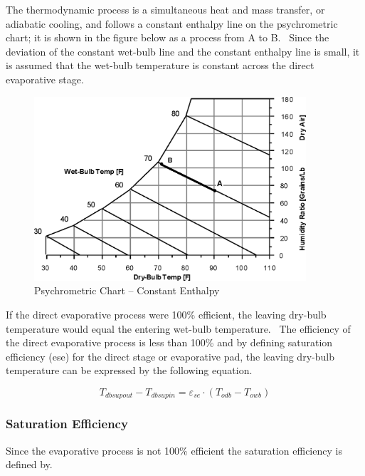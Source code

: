 The thermodynamic process is a simultaneous heat and mass transfer, or adiabatic cooling, and follows a constant enthalpy line on the psychrometric chart; it is shown in the figure below as a process from A to B.~ Since the deviation of the constant wet-bulb line and the constant enthalpy line is small, it is assumed that the wet-bulb temperature is constant across the direct evaporative stage.

\begin{figure}[hbtp] %
\centering
\includegraphics[width=0.9\textwidth, height=0.9\textheight, keepaspectratio=true]{media/image4790.png}
\caption{Psychrometric Chart -- Constant Enthalpy \protect \label{fig:psychrometric-chart-constant-enthalpy}}
\end{figure}

If the direct evaporative process were 100\% efficient, the leaving dry-bulb temperature would equal the entering wet-bulb temperature.~ The efficiency of the direct evaporative process is less than 100\% and by defining saturation efficiency (ese) for the direct stage or evaporative pad, the leaving dry-bulb temperature can be expressed by the following equation.

\begin{equation}
{T_{dbsupout}} - {T_{dbsupin}} = {\varepsilon_{se}} \cdot \left( {{T_{odb}} - {T_{owb}}} \right)
\end{equation}

\subsubsection{Saturation Efficiency}\label{saturation-efficiency}

Since the evaporative process is not 100\% efficient the saturation efficiency is defined by.

